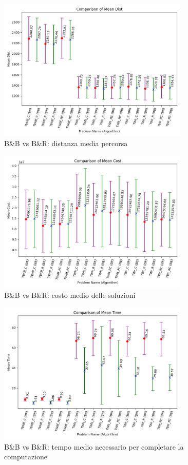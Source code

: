 \documentclass[
    article,            %
    12pt,                %
    oneside,            %
    a4paper,            %
    english,            %
    italian,                %
    sumario=tradicional,
]{abntex2}
\begin{document}
\newpage{}
\vspace*{\fill}
\begin{figure}[h!]
    \centering
    \includegraphics[width=0.81\textwidth]{Images/Mean_dist.png}
    \caption{B\&B vs B\&R: distanza media percorsa}
    \label{fig:Mean_dist}
\end{figure}
\begin{figure}[h!]
    \centering
    \includegraphics[width=0.81\textwidth]{Images/Mean_cost.png}
    \caption{B\&B vs B\&R: costo medio delle soluzioni}
    \label{fig:Mean_cost}
\end{figure}
\vspace*{\fill}

\newpage{}
\begin{figure}[h!]
    \centering
    \includegraphics[width=0.81\textwidth]{Images/mean_time.png}
    \caption{B\&B vs B\&R: tempo medio necessario per completare la computazione}
    \label{fig:mean_time}
\end{figure}

\vspace{1.5cm}
\printbibliography[title=Bibliografia]
\end{document}

